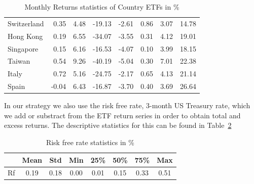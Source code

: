 \documentclass[a4paper,12pt,twoside]{article}
\begin{document}
\begin{table}[ht]
\begin{tabular}{lrrrrrrr}
Switzerland  & 0.35          & 4.48         & -19.13       & -2.61         & 0.86          & 3.07          & 14.78       \\
Hong Kong    & 0.19          & 6.55         & -34.07       & -3.55         & 0.31          & 4.12          & 19.01       \\
Singapore    & 0.15          & 6.16         & -16.53       & -4.07         & 0.10          & 3.99          & 18.15       \\
Taiwan       & 0.54          & 9.26         & -40.19       & -5.04         & 0.30          & 7.01          & 22.38       \\
Italy        & 0.72          & 5.16         & -24.75       & -2.17         & 0.65          & 4.13          & 21.14       \\
Spain        & -0.04         & 6.43         & -16.87       & -3.70         & 0.40          & 3.69          & 26.64       \\
\bottomrule
\end{tabular}
\caption{Monthly Returns statistics of Country ETFs in \%}
\label{tab:summary_stats_return}
\end{table}


In our strategy we also use the risk free rate, 3-month US Treasury rate, which we add or substract from the ETF return series in order to obtain total and excess returns. The descriptive statistics for this can be found in Table~\ref{tab:summary_stats_rf}


\begin{table}[ht]
\centering
\begin{tabular}{lccccccc}
\toprule
    & \textbf{Mean} & \textbf{Std} & \textbf{Min} & \textbf{25\%} & \textbf{50\%} & \textbf{75\%} & \textbf{Max} \\
\midrule
  Rf & 0.19 & 0.18 & 0.00 & 0.01 & 0.15 & 0.33 & 0.51 \\
\bottomrule
\end{tabular}
\caption{Risk free rate statistics in \% }
\label{tab:summary_stats_rf}
\end{table}


\newpage
\end{document}
